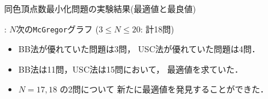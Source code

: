 \documentclass[dvipdfmx,11pt]{beamer}
\newcommand{\code}[1]{\lstinline[basicstyle=\ttfamily]{#1}}
\begin{document}
\begin{frame}{同色頂点数最小化問題の実験結果(最適値と最良値)}
 \begin{block}{}
  : $N$次の\code{McGregor}グラフ ($3 \leq N\leq 20$: 計18問)
 \end{block}

 \begin{center}
  
 \end{center}

 \begin{itemize}
  \item BB法が優れていた問題は3問，
        USC法が優れていた問題は4問．
  \item BB法は11問，USC法は15問において，
	最適値を求ていた．
  \item $N = 17,18$ の2問について
	新たに最適値を発見することができた．
 \end{itemize}
\end{frame}
\end{document}
